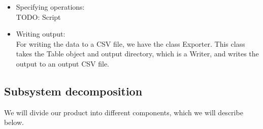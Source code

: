 \documentclass[11pt,twoside,a4paper]{article}
\begin{document}
\begin{itemize}
\item Specifying operations:\\
TODO: Script

\item Writing output:\\
For writing the data to a CSV file, we have the class Exporter. This class takes the Table object and output directory, which is a Writer, and writes the output to an output CSV file. 

\end{itemize}

\subsection{Subsystem decomposition}
We will divide our product into different components, which we will describe below. 
\end{document}
